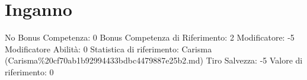 \section{Inganno}\label{inganno}

\begin{description}
\tightlist
\item[Tags: ABI]
No Bonus Competenza: 0 Bonus Competenza di Riferimento: 2 Modificatore:
-5 Modificatore Abilità: 0 Statistica di riferimento: Carisma
(Carisma\%20cf70ab1b92994433bdbc4479887e25b2.md) Tiro Salvezza: -5
Valore di riferimento: 0
\end{description}

